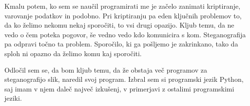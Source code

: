 Kmalu potem, ko sem se naučil programirati me je začelo zanimati kriptiranje, varovanje podatkov in podobno. Pri kriptiranju pa eden ključnih problemov to, da ko želimo nekomu nekaj sporočiti, to vsi drugi opazijo. Kljub temu, da ne vedo o čem poteka pogovor, še vedno vedo kdo komunicira s kom. Steganografija pa odpravi točno ta problem. Sporočilo, ki ga pošljemo je zakrinkano, tako da sploh ni opazno da želimo komu kaj sporočiti.

Odločil sem se, da bom kljub temu, da že obstaja več programov za steganografijo slik, naredil svoj program. Izbral sem si programski jezik Python, saj imam v njem daleč največ izkušenj, v primerjavi z ostalimi programskimi jeziki.
